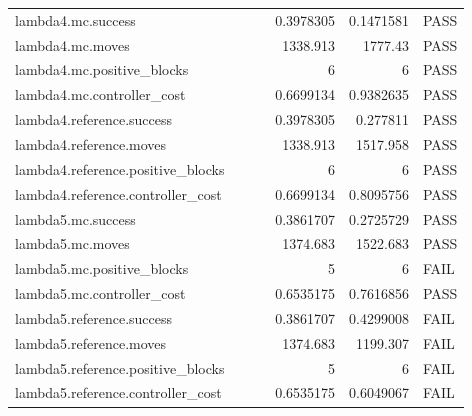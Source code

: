 \documentclass[10pt]{article}
\begin{document}
{\begin{longtable}{p{0.58\linewidth}rrl}
lambda4.mc.success & 0.3978305 & 0.1471581 & PASS \\
lambda4.mc.moves & 1338.913 & 1777.43 & PASS \\
lambda4.mc.positive\_blocks & 6 & 6 & PASS \\
lambda4.mc.controller\_cost & 0.6699134 & 0.9382635 & PASS \\
lambda4.reference.success & 0.3978305 & 0.277811 & PASS \\
lambda4.reference.moves & 1338.913 & 1517.958 & PASS \\
lambda4.reference.positive\_blocks & 6 & 6 & PASS \\
lambda4.reference.controller\_cost & 0.6699134 & 0.8095756 & PASS \\
lambda5.mc.success & 0.3861707 & 0.2725729 & PASS \\
lambda5.mc.moves & 1374.683 & 1522.683 & PASS \\
lambda5.mc.positive\_blocks & 5 & 6 & FAIL \\
lambda5.mc.controller\_cost & 0.6535175 & 0.7616856 & PASS \\
lambda5.reference.success & 0.3861707 & 0.4299008 & FAIL \\
lambda5.reference.moves & 1374.683 & 1199.307 & FAIL \\
lambda5.reference.positive\_blocks & 5 & 6 & FAIL \\
lambda5.reference.controller\_cost & 0.6535175 & 0.6049067 & FAIL \\
\bottomrule\end{longtable}}
\end{document}
